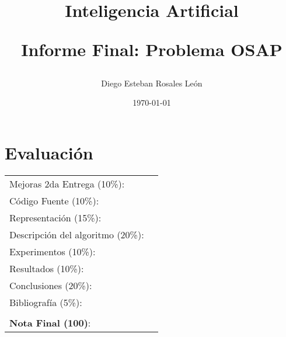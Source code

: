 \documentclass[letter, 10pt]{article}
\begin{document}
\title{Inteligencia Artificial \\ \begin{Large}Informe Final: Problema OSAP\end{Large}}
\author{Diego Esteban Rosales Le\'on}
\date{\today}
\maketitle

\section*{Evaluaci\'on}

\begin{tabular}{ll}
Mejoras 2da Entrega (10\%): &  \underline{\hspace{2cm}}\\
C\'odigo Fuente (10\%): &  \underline{\hspace{2cm}}\\
Representaci\'on (15\%):  & \underline{\hspace{2cm}} \\
Descripci\'on del algoritmo (20\%):  & \underline{\hspace{2cm}} \\
Experimentos (10\%):  & \underline{\hspace{2cm}} \\
Resultados (10\%):  & \underline{\hspace{2cm}} \\
Conclusiones (20\%): &  \underline{\hspace{2cm}}\\
Bibliograf\'ia (5\%): & \underline{\hspace{2cm}}\\
 &  \\
\textbf{Nota Final (100)}:   & \underline{\hspace{2cm}}
\end{tabular}
\vspace{2cm}
\end{document}
